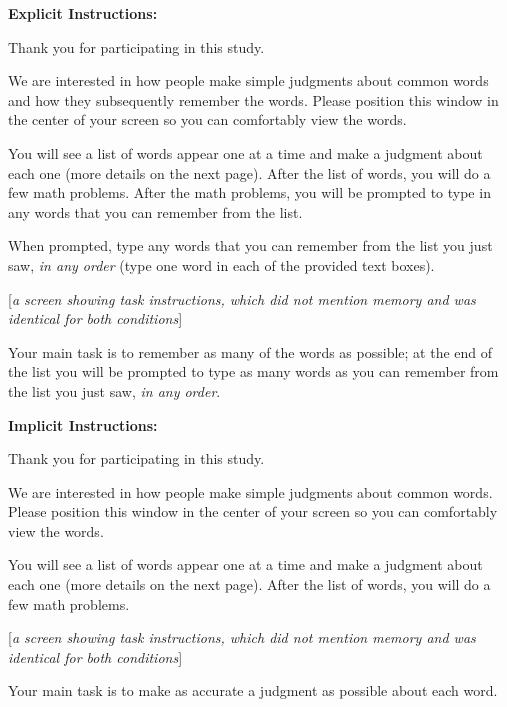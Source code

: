 \documentclass[jou,natbib]{apa6} %
\begin{document}
\textbf{Explicit Instructions:}

\begin{displayquote}
        Thank you for participating in this study. 

        We are interested in how people make simple judgments about common words and
        how they subsequently remember the words. Please position this window in the center
        of your screen so you can comfortably view the words.

        You will see a list of words appear one at a time and make a judgment about each one
        (more details on the next page). After the list of words, you will do a few math problems.
        After the math problems, you will be prompted to type in any words that you can remember
        from the list.

        When prompted, type any words that you can remember from the list you just saw,
        \emph{in any order} (type one word in each of the provided text boxes).

    [\textit{a screen showing task instructions, which did not mention memory and was identical for both conditions}]

        Your main task is to remember as many of the words as possible; at the end of the list you will be prompted to
    type as many words as you can remember from the list you just saw, \emph{in any order}.
\end{displayquote}


\textbf{Implicit Instructions:}

\begin{displayquote}
        Thank you for participating in this study.

        We are interested in how people make simple judgments about common words.
        Please position this window in the center of your screen so you can comfortably view the words.

        You will see a list of words appear one at a time and make a judgment about each one
        (more details on the next page). After the list of words, you will do a few math problems.
        
        [\textit{a screen showing task instructions, which did not mention memory and was identical for both conditions}]


        Your main task is to make as accurate a judgment as possible about each word.
\end{displayquote}
\end{document}
